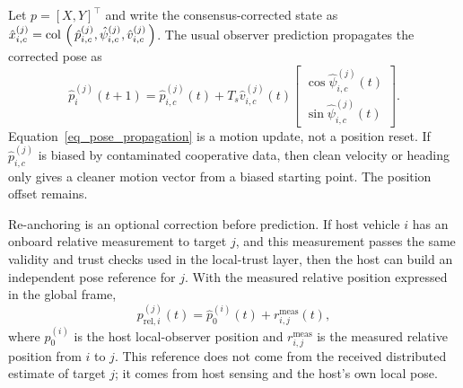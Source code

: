 \documentclass[letterpaper,journal]{IEEEtran}
\def\col#1{\mathop{{\rm col}\,\left(\,#1\,\right)}}
\begin{document}
Let $p=[X,Y]^\top$ and write the consensus-corrected state as
$\hat{x}_{i,c}^{(j)}=\col{\hat p_{i,c}^{(j)},\hat\psi_{i,c}^{(j)},\hat v_{i,c}^{(j)}}$.
The usual observer prediction propagates the corrected pose as
\begin{equation}
    \hat p_i^{(j)}(t+1)
    =
    \hat p_{i,c}^{(j)}(t)
    +T_s\hat v_{i,c}^{(j)}(t)
    \begin{bmatrix}
        \cos \hat\psi_{i,c}^{(j)}(t)\\
        \sin \hat\psi_{i,c}^{(j)}(t)
    \end{bmatrix}.
    \label{eq_pose_propagation}
\end{equation}
Equation~\eqref{eq_pose_propagation} is a motion update, not a position reset. If $\hat p_{i,c}^{(j)}$ is biased by contaminated cooperative data, then clean velocity or heading only gives a cleaner motion vector from a biased starting point. The position offset remains.

Re-anchoring is an optional correction before prediction. If host vehicle $i$ has an onboard relative measurement to target $j$, and this measurement passes the same validity and trust checks used in the local-trust layer, then the host can build an independent pose reference for $j$. With the measured relative position expressed in the global frame,
\begin{equation}
    p_{\mathrm{rel},i}^{(j)}(t)
    =
    \hat p_0^{(i)}(t)+r_{i,j}^{\mathrm{meas}}(t),
    \label{eq_relative_pose_anchor}
\end{equation}
where $\hat p_0^{(i)}$ is the host local-observer position and $r_{i,j}^{\mathrm{meas}}$ is the measured relative position from $i$ to $j$. This reference does not come from the received distributed estimate of target $j$; it comes from host sensing and the host's own local pose.
\end{document}
